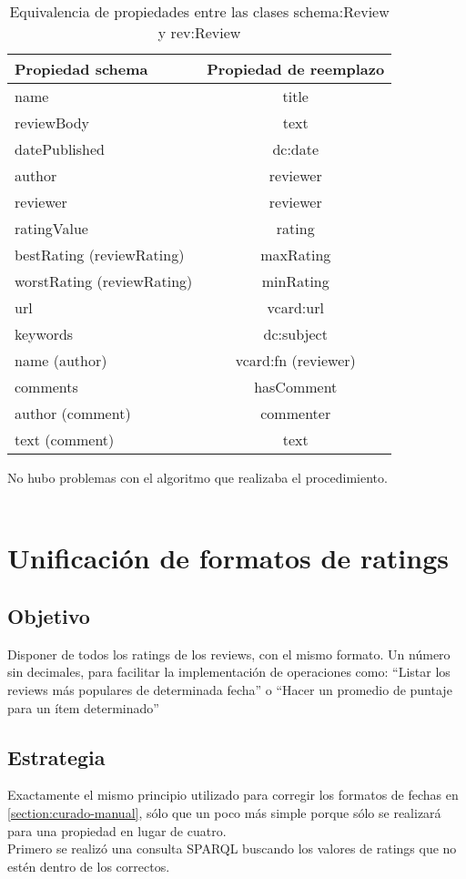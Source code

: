 \begin{table}[h]
\begin{tabular}{| l | c |}\hline
Propiedad schema & Propiedad de reemplazo\\\hline
name & title \\
reviewBody & text \\
datePublished & dc:date \\
author & reviewer \\
reviewer & reviewer \\
ratingValue & rating\\
bestRating (reviewRating) & maxRating\\
worstRating (reviewRating)& minRating\\
url & vcard:url\\
keywords & dc:subject\\
name (author) & vcard:fn (reviewer)\\
comments & hasComment\\
author (comment) & commenter \\
text (comment) & text \\\hline
\end{tabular}
\caption{Equivalencia de propiedades entre las clases schema:Review y rev:Review}
\label{table:PropertyEquiv}
\end{table}
No hubo problemas con el algoritmo que realizaba el procedimiento.
\\
\\
\section{Unificación de formatos de ratings}
\label{section:unificacion-ratings}

\subsection*{Objetivo} Disponer de todos los ratings de los reviews, con el mismo formato. Un número sin decimales, para facilitar la implementación 
de operaciones como: ``Listar los reviews más populares de determinada fecha'' o ``Hacer un promedio de puntaje para un ítem determinado''

\subsection*{Estrategia} Exactamente el mismo principio utilizado para corregir los formatos de fechas en \ref{section:curado-manual}, sólo que un poco más simple porque sólo se realizará 
para una propiedad en lugar de cuatro.
\\
Primero se realizó una consulta SPARQL buscando los valores de ratings que no estén dentro de los correctos. \\

